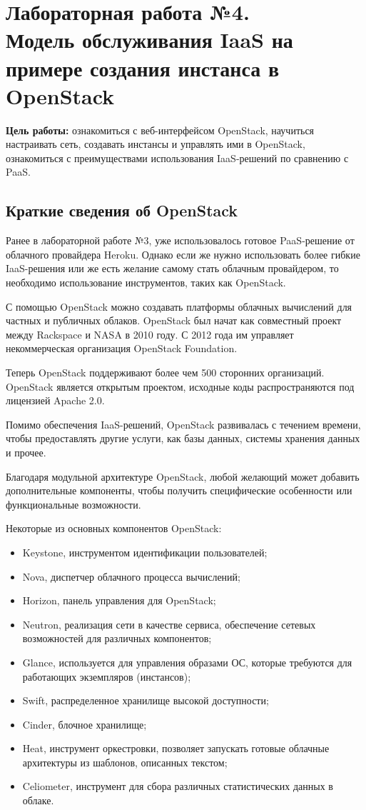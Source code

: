 \section[ЛР №4. Модель обслуживания IaaS, OpenStack]{Лабораторная работа №4. \\
Модель обслуживания IaaS на примере создания инстанса в OpenStack}

\textbf{Цель работы:} ознакомиться с веб-интерфейсом OpenStack, научиться настраивать сеть, создавать инстансы и управлять ими в OpenStack, ознакомиться с преимуществами использования IaaS-решений по сравнению с PaaS.

\subsection{Краткие сведения об OpenStack}

Ранее в лабораторной работе №3, уже использовалось готовое PaaS-решение от облачного провайдера Heroku.
Однако если же нужно использовать более гибкие IaaS-решения или же есть желание самому стать облачным провайдером, то необходимо использование инструментов, таких как OpenStack.

С помощью OpenStack можно создавать платформы облачных вычислений для частных и публичных облаков.
OpenStack был начат как совместный проект между Rackspace и NASA в 2010 году.
С 2012 года им управляет некоммерческая организация OpenStack Foundation.

Теперь OpenStack поддерживают более чем 500 сторонних организаций.
OpenStack является открытым проектом, исходные коды распространяются под лицензией Apache 2.0.

Помимо обеспечения IaaS-решений, OpenStack развивалась с течением времени, чтобы предоставлять другие услуги, как базы данных, системы хранения данных и прочее.

Благодаря модульной архитектуре OpenStack, любой желающий может добавить дополнительные компоненты, чтобы получить специфические особенности или функциональные возможности.

Некоторые из основных компонентов OpenStack:
\begin{itemize}
    \item Keystone, инструментом идентификации пользователей;
    \item Nova, диспетчер облачного процесса вычислений;
    \item Horizon, панель управления для OpenStack;
    \item Neutron, реализация сети в качестве сервиса, обеспечение сетевых возможностей для различных компонентов;
    \item Glance, используется для управления образами ОС, которые требуются для работающих экземпляров (инстансов);
    \item Swift, распределенное хранилище высокой доступности;
    \item Cinder, блочное хранилище;
    \item Heat, инструмент оркестровки, позволяет запускать готовые облачные архитектуры из шаблонов, описанных текстом;
    \item Celiometer, инструмент для сбора различных статистических данных в облаке.
\end{itemize}

